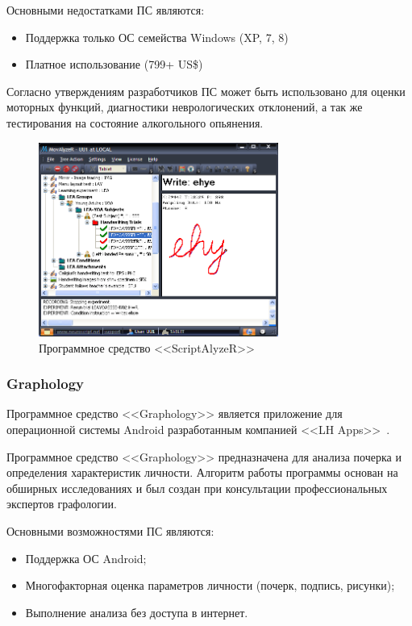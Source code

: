 Основными недостатками ПС являются:
\begin{itemize}
  \item Поддержка только ОС семейства Windows (XP, 7, 8)
  \item Платное использование (799+ US\$)
\end{itemize}

Согласно утверждениям разработчиков ПС может быть использовано для оценки моторных функций, диагностики неврологических отклонений, а так же тестирования на состояние алкогольного опьянения.

\begin{figure}[ht]
    \centering
    \label{fig:domain:analogs:neuro_script}
    \includegraphics[width=0.7\textwidth]{figures/neuroscript.png}
    \caption{Программное средство <<ScriptAlyzeR>>}
\end{figure}

\subsubsection{Graphology}
\label{sub:domain:analogs:graphology} 

Программное средство <<Graphology>> является приложение для операционной системы Android разработанным компанией <<LH Apps>>~\cite{analogs_graphology}.

Программное средство <<Graphology>> предназначена для анализа почерка и определения характеристик личности. Алгоритм работы программы основан на обширных исследованиях и был создан при консультации профессиональных экспертов графологии.

Основными возможностями ПС являются:
\begin{itemize}
  \item Поддержка ОС Android;
  \item Многофакторная оценка параметров личности (почерк, подпись, рисунки);
  \item Выполнение анализа без доступа в интернет.
\end{itemize}

